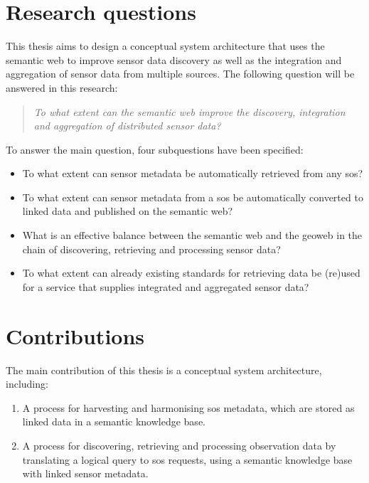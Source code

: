 \section{Research questions}
\label{RQ}
This thesis aims to design a conceptual system architecture that uses the semantic web to improve sensor data discovery as well as the integration and aggregation of sensor data from multiple sources. The following question will be answered in this research:    

\begin{quote}
	\textit{To what extent can the semantic web improve the discovery, integration and aggregation of distributed sensor data?}
\end{quote}

To answer the main question, four subquestions have been specified:
\begin{itemize}
	\item To what extent can sensor metadata be automatically retrieved from any \acl{sos}?
	\item To what extent can sensor metadata from a \acl{sos} be automatically converted to linked data and published on the semantic web?
	\item  What is an effective balance between the semantic web and the geoweb in the chain of discovering, retrieving and processing sensor data?
	\item To what extent can already existing standards for retrieving data be (re)used for a service that supplies integrated and aggregated sensor data?
\end{itemize}

\section{Contributions}
\label{contributions}

The main contribution of this thesis is a conceptual system architecture, including:
\begin{enumerate}
	\item A process for harvesting and harmonising \ac{sos} metadata, which are stored as linked data in a semantic knowledge base.
	\item A process for discovering, retrieving and processing observation data by translating a logical query to \ac{sos} requests, using a semantic knowledge base with linked sensor metadata. 
\end{enumerate}

